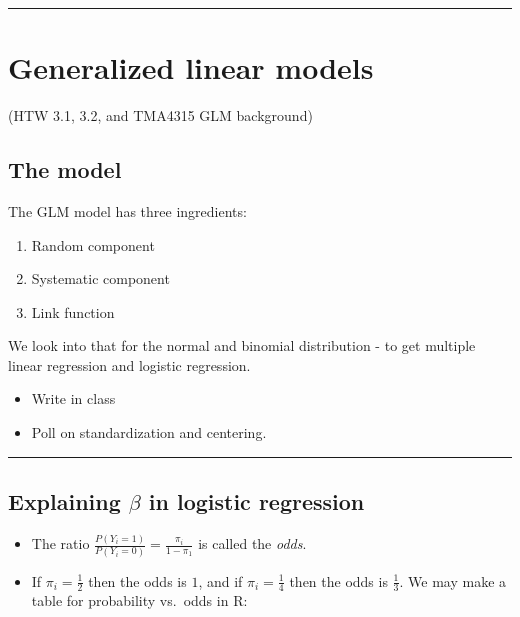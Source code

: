 \documentclass[
  letterpaper,
  DIV=11,
  numbers=noendperiod]{scrartcl}
\providecommand{\tightlist}{%
  \setlength{\itemsep}{0pt}\setlength{\parskip}{0pt}}\usepackage{longtable,booktabs,array}
\begin{document}
\begin{center}\rule{0.5\linewidth}{0.5pt}\end{center}

\hypertarget{generalized-linear-models}{%
\section{Generalized linear models}\label{generalized-linear-models}}

(HTW 3.1, 3.2, and TMA4315 GLM background)

\hypertarget{the-model}{%
\subsection{The model}\label{the-model}}

The GLM model has three ingredients:

\begin{enumerate}
\def\labelenumi{\arabic{enumi})}
\tightlist
\item
  Random component
\item
  Systematic component
\item
  Link function
\end{enumerate}

We look into that for the normal and binomial distribution - to get
multiple linear regression and logistic regression.

\begin{itemize}
\tightlist
\item
  Write in class
\item
  Poll on standardization and centering.
\end{itemize}

\begin{center}\rule{0.5\linewidth}{0.5pt}\end{center}

\hypertarget{explaining-beta-in-logistic-regression}{%
\subsection{\texorpdfstring{Explaining \(\beta\) in logistic
regression}{Explaining \textbackslash beta in logistic regression}}\label{explaining-beta-in-logistic-regression}}

\begin{itemize}
\item
  The ratio \(\frac{P(Y_i=1)}{P(Y_i=0)}=\frac{\pi_i}{1-\pi_1}\) is
  called the \emph{odds}.
\item
  If \(\pi_i=\frac{1}{2}\) then the odds is \(1\), and if
  \(\pi_i=\frac{1}{4}\) then the odds is \(\frac{1}{3}\). We may make a
  table for probability vs.~odds in R:
\end{itemize}
\end{document}
